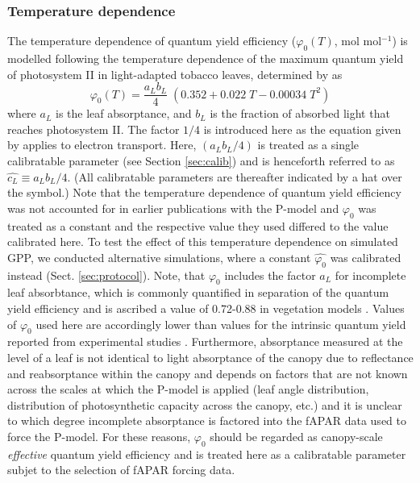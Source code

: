 \documentclass{myreport}
\begin{document}
\subsubsection{Temperature dependence}
\label{sec:tempstress}
The temperature dependence of quantum yield efficiency ($\varphi_0(T)$, mol mol$^{-1}$) is modelled following the temperature dependence of the maximum quantum yield of photosystem II in light-adapted tobacco leaves, determined by \citet{bernacchi03pce} as 
\begin{equation}
\label{eq:bernacchi03}
\varphi_0(T) = \frac{a_L b_L}{4} \; ( 0.352 + 0.022\;T - 0.00034\;T^2 )
\end{equation}
where $a_L$ is the leaf absorptance, and $b_L$ is the fraction of absorbed light that reaches photosystem II. The factor $1/4$ is introduced here as the equation given by \citet{bernacchi03pce} applies to electron transport. Here, $(a_L b_L / 4)$ is treated as a single calibratable parameter (see Section \ref{sec:calib}) and is henceforth referred to as $\widehat{c_L}\equiv a_L b_L / 4$. (All calibratable parameters are thereafter indicated by a hat over the symbol.) Note that the temperature dependence of quantum yield efficiency was not accounted for in earlier publications with the P-model \citep{keenan17natcomm, wang17natpl} and $\varphi_0$ was treated as a constant and the respective value they used differed to the value calibrated here. To test the effect of this temperature dependence on simulated GPP, we conducted alternative simulations, where a constant $\widehat{\varphi_0}$ was calibrated instead (Sect. \ref{sec:protocol}). Note, that $\varphi_0$ includes the factor $a_L$ for incomplete leaf absorbtance, which is commonly quantified in separation of the quantum yield efficiency and is ascribed a value of 0.72-0.88 in vegetation models \citep{rogers17}. Values of $\varphi_0$ used here are accordingly lower than values for the intrinsic quantum yield reported from experimental studies \citep{long93, singsaas01}. Furthermore, absorptance measured at the level of a leaf is not identical to light absorptance of the canopy  due to reflectance and reabsorptance within the canopy and depends on factors that are not known across the scales at which the P-model is applied (leaf angle distribution, distribution of photosynthetic capacity across the canopy, etc.) and it is unclear to which degree incomplete absorptance is factored into the fAPAR data used to force the P-model. For these reasons, $\varphi_0$ should be regarded as canopy-scale \textit{effective} quantum yield efficiency and is treated here as a calibratable parameter subjet to the selection of fAPAR forcing data. 
\end{document}
